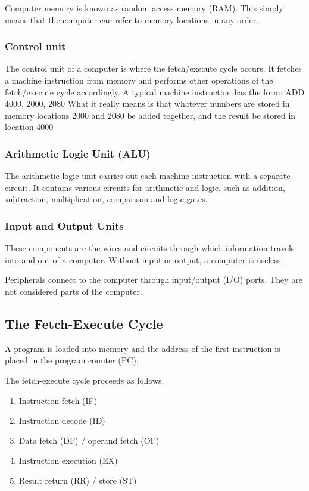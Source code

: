 Computer memory is known as random access memory (RAM).
This simply means that the computer can refer to memory locations in any order.

\subsubsection{Control unit}

The control unit of a computer is where the fetch/execute cycle occurs.
It fetches a machine instruction from memory and performs other operations of the fetch/execute cycle accordingly.
A typical machine instruction has the form:
ADD 4000, 2000, 2080
What it really means is that whatever numbers are stored in memory locations 2000 and 2080 be added together, and the result be stored in location 4000

\subsubsection{Arithmetic Logic Unit (ALU)}

The arithmetic logic unit carries out each machine instruction with a separate circuit.
It contains various circuits for arithmetic and logic, such as addition, subtraction, multiplication, comparison and logic gates.

\subsubsection{Input and Output Units}

These components are the wires and circuits through which information travels into and out of a computer.
Without input or output, a computer is useless.

Peripherals connect to the computer through input/output (I/O) ports.
They are not considered parts of the computer.

\subsection{The Fetch-Execute Cycle}

A program is loaded into memory and the address of the first instruction is placed in the program counter (PC).

The fetch-execute cycle proceeds as follows.
\begin{enumerate}
  \item Instruction fetch (IF)
  \item Instruction decode (ID)
  \item Data fetch (DF) / operand fetch (OF)
  \item Instruction execution (EX)
  \item Result return (RR) / store (ST)
\end{enumerate}

